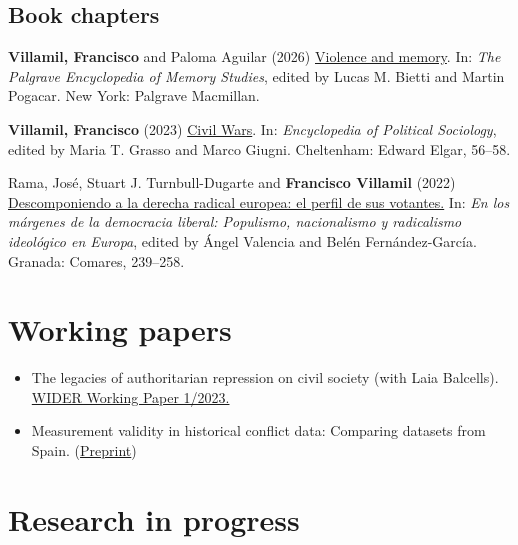 \documentclass[a4paper, 12pt]{article}
\begin{document}
\subsection*{Book chapters}

\begin{etaremune}[leftmargin=12pt, itemsep=0pt]
\item \textbf{Villamil, Francisco} and Paloma Aguilar (2026) \href{https://doi.org/10.1007/978-3-030-93789-8_49-1}{Violence and memory}. In: \textit{The Palgrave Encyclopedia of Memory Studies}, edited by Lucas M. Bietti and Martin Pogacar. New York: Palgrave Macmillan. %
\item \textbf{Villamil, Francisco} (2023) \href{https://doi.org/10.4337/9781803921235.00020}{Civil Wars}. In: \textit{Encyclopedia of Political Sociology}, edited by Maria T. Grasso and Marco Giugni. Cheltenham: Edward Elgar, 56--58. %
\item Rama, José, Stuart J. Turnbull-Dugarte and \textbf{Francisco Villamil} (2022) \href{https://www.comares.com/libro/en-los-margenes-de-la-democracia-liberal_143816/}{Descomponiendo a la derecha radical europea: el perfil de sus votantes.} In: \textit{En los márgenes de la democracia liberal: Populismo, nacionalismo y radicalismo ideológico en Europa}, edited by Ángel Valencia and Belén Fernández-García. Granada: Comares, 239--258. %
\end{etaremune}

\section*{Working papers}

\begin{itemize}[leftmargin=*, nolistsep]
\item The legacies of authoritarian repression on civil society (with Laia Balcells).\\\href{https://doi.org/10.35188/UNU-WIDER/2023/309-3}{WIDER Working Paper 1/2023.}
\item Measurement validity in historical conflict data: Comparing datasets from Spain. (\href{https://osf.io/c6wgk/}{Preprint})
\end{itemize}

\section*{Research in progress}
\end{document}
